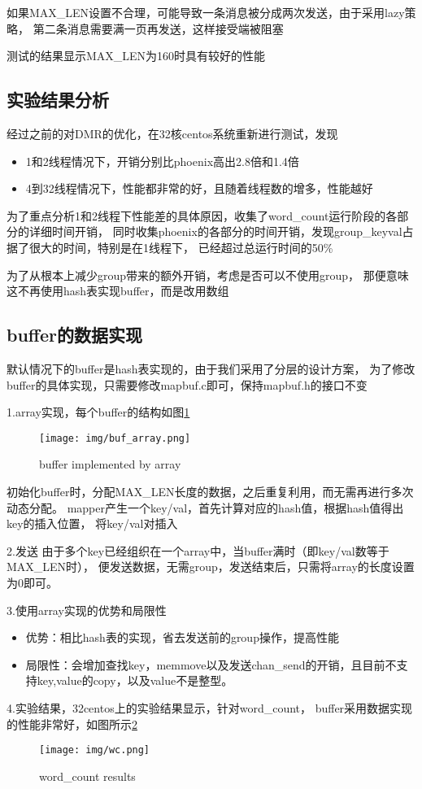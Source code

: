 如果MAX\_LEN设置不合理，可能导致一条消息被分成两次发送，由于采用lazy策略，
第二条消息需要满一页再发送，这样接受端被阻塞

测试的结果显示MAX\_LEN为160时具有较好的性能

\subsection{实验结果分析}
经过之前的对DMR的优化，在32核centos系统重新进行测试，发现
\begin{itemize}
  \item 1和2线程情况下，开销分别比phoenix高出2.8倍和1.4倍
  \item 4到32线程情况下，性能都非常的好，且随着线程数的增多，性能越好
\end{itemize}

为了重点分析1和2线程下性能差的具体原因，收集了word\_count运行阶段的各部分的详细时间开销，
同时收集phoenix的各部分的时间开销，发现group\_keyval占据了很大的时间，特别是在1线程下，
已经超过总运行时间的50\%

为了从根本上减少group带来的额外开销，考虑是否可以不使用group，
那便意味这不再使用hash表实现buffer，而是改用数组

\subsection{buffer的数据实现}
默认情况下的buffer是hash表实现的，由于我们采用了分层的设计方案，
为了修改buffer的具体实现，只需要修改mapbuf.c即可，保持mapbuf.h的接口不变

1.array实现，每个buffer的结构如图\ref{buf_array}
\begin{figure}[!h]
    \centering
    \texttt{[image: img/buf\_array.png]}
    \caption{buffer implemented by array}
\label{buf_array}
\end{figure}
初始化buffer时，分配MAX\_LEN长度的数据，之后重复利用，而无需再进行多次动态分配。
mapper产生一个key/val，首先计算对应的hash值，根据hash值得出key的插入位置，
将key/val对插入

2.发送
由于多个key已经组织在一个array中，当buffer满时（即key/val数等于MAX\_LEN时），
便发送数据，无需group，发送结束后，只需将array的长度设置为0即可。

3.使用array实现的优势和局限性
\begin{itemize}
  \item 优势：相比hash表的实现，省去发送前的group操作，提高性能
  \item 局限性：会增加查找key，memmove以及发送chan\_send的开销，且目前不支持key,value的copy，以及value不是整型。
\end{itemize}

4.实验结果，32centos上的实验结果显示，针对word\_count，
buffer采用数据实现的性能非常好，如图所示\ref{wc}
\begin{figure}[!h]
    \centering
    \texttt{[image: img/wc.png]}
    \caption{word\_count results}
\label{wc}
\end{figure}




